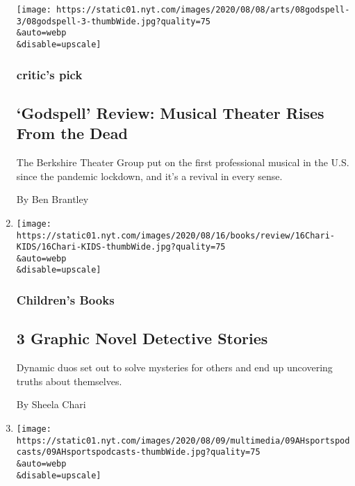 \begin{enumerate}
  \texttt{[image: https://static01.nyt.com/images/2020/08/08/arts/08godspell-3/08godspell-3-thumbWide.jpg?quality=75\\\&auto=webp\\\&disable=upscale]}

  \hypertarget{critics-pick}{%
  \subsubsection{critic's pick}\label{critics-pick}}

  \hypertarget{godspell-review-musical-theater-rises-from-the-dead}{%
  \subsection{`Godspell' Review: Musical Theater Rises From the
  Dead}\label{godspell-review-musical-theater-rises-from-the-dead}}

  The Berkshire Theater Group put on the first professional musical in
  the U.S. since the pandemic lockdown, and it's a revival in every
  sense.

  By Ben Brantley
\item
  \href{/2020/08/08/books/review/drew-dernavich-elvin-link-please-report-to-the-principals-office.html}{}

  \texttt{[image: https://static01.nyt.com/images/2020/08/16/books/review/16Chari-KIDS/16Chari-KIDS-thumbWide.jpg?quality=75\\\&auto=webp\\\&disable=upscale]}

  \hypertarget{childrens-books}{%
  \subsubsection{Children's Books}\label{childrens-books}}

  \hypertarget{3-graphic-novel-detective-stories}{%
  \subsection{3 Graphic Novel Detective
  Stories}\label{3-graphic-novel-detective-stories}}

  Dynamic duos set out to solve mysteries for others and end up
  uncovering truths about themselves.

  By Sheela Chari
\item
  \href{/2020/08/08/at-home/coronavirus-sports-podcasts.html}{}

  \texttt{[image: https://static01.nyt.com/images/2020/08/09/multimedia/09AHsportspodcasts/09AHsportspodcasts-thumbWide.jpg?quality=75\\\&auto=webp\\\&disable=upscale]}


\end{enumerate}
